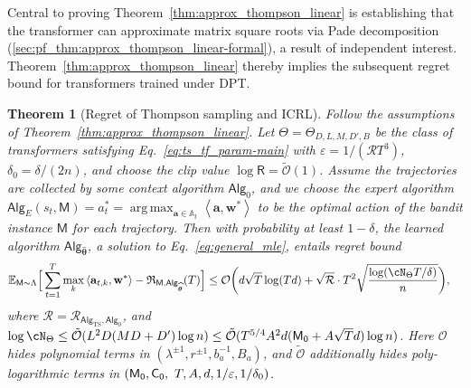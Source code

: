 \documentclass[10pt]{article}
\newtheorem{theorem}{Theorem}
\newcommand{\eps}{\varepsilon}
\DeclareMathOperator*{\argmax}{arg\,max}
\renewcommand{\cO}{\mathcal{O}}
\newcommand{\<}{\left\langle}
\renewcommand{\>}{\right\rangle}
\newcommand{\E}{\mathbb{E}}
\newcommand{\inst}{{\mathsf{M}}}
\newcommand{\TS}{{\mathrm{TS}}}
\newcommand{\Tpspar}{{\lambda}}
\newcommand{\Tpsparn}{{r}}
\newcommand{\tcO}{{\tilde{\mathcal O}}}
\newcommand{\state}{{s}}
\newcommand{\action}{{a}}
\newcommand{\totlen}{{T}}
\newcommand{\sAlg}{{\mathsf{Alg}}}
\newcommand{\Numobs}{{n}}
\newcommand{\Parspace}{{\Theta}}
\newcommand{\esttfpar}{{\widehat{\btheta}}}
\newcommand{\prior}{{\Lambda}}
\newcommand{\shortexp}{{E}}
\newcommand{\layer}{{L}}
\newcommand{\hidden}{{D'}}
\newcommand{\head}{{M}}
\newcommand{\clipval}{{\mathsf{R}}}
\newcommand{\embd}{{D}}
\newcommand{\totreward}{{\mathfrak{R}}}
\newcommand{\distratio}{{\mathcal{R}}}
\newcommand{\Numact}{{A}}
\newcommand{\neuron}{{\mathsf{M_0}}}
\newcommand{\weightn}{{{\mathsf{C_0}}}}
\def\sA{{\mathbb{A}}}
\def\btheta{{\boldsymbol \theta}}
\def\ba{{\mathbf a}}
\def\bw{{\mathbf w}}
\begin{document}
Central to proving Theorem~\ref{thm:approx_thompson_linear} is establishing that the transformer can approximate matrix square roots via Pade decomposition (\cref{sec:pf_thm:approx_thompson_linear-formal}), a result of independent interest. Theorem~\ref{thm:approx_thompson_linear} thereby implies the subsequent regret bound for transformers trained under DPT.
\begin{theorem}
[Regret of Thompson sampling and ICRL]\label{thm:ts_linear_regret}
Follow the assumptions of Theorem~\ref{thm:approx_thompson_linear}. Let $\Theta = \Theta_{D, L, M, \hidden, B}$ be the class of transformers satisfying Eq.~\eqref{eq:ts_tf_param-main} with $\eps=1/(\distratio\totlen^3)$,   $\delta_0=\delta/(2n)$, and choose the clip value $\log \clipval = \tcO(1)$. Assume the trajectories are collected by some context algorithm $\sAlg_0$, and we choose the expert algorithm $\sAlg_\shortexp(\state_t,\inst)=\action^*_t=\argmax_{\ba\in\sA_t}\<\ba,\bw^*\>$ to be the optimal action of the bandit instance $\inst$ for each trajectory. Then with probability at least $1-\delta$, the learned algorithm $\sAlg_{\esttfpar}$, a solution to Eq.~\eqref{eq:general_mle}, entails regret bound
\begin{align*}
\E_{\inst\sim\prior}\Big[\sum_{t=1}^\totlen\max_{k}\<\ba_{t,k},\bw^*\>-\totreward_{\inst,\sAlg_\esttfpar}(\totlen)\Big]&\leq \cO \bigg( d\sqrt{T}\log(Td)+ \sqrt{\distratio} \cdot\totlen^2\sqrt{\frac{\log ( \cN_{\Parspace} \totlen/\delta ) }{n} } \bigg),
\end{align*}
where $\distratio = \distratio_{\sAlg_\TS,\sAlg_0}$, and $\log \cN_{\Parspace} \le \tcO(\layer^2\embd(\head\embd+\hidden)\log \Numobs )  \leq\tcO(\totlen^{5/4}\Numact^2 d(\neuron+\Numact\sqrt{\totlen}d)\log\Numobs)$. Here $\cO$ hides polynomial terms in $(\Tpspar^{\pm1}, \Tpsparn^{\pm1}, b_a^{-1}, B_a)$, and $\tcO$ additionally hides poly-logarithmic terms in   $(\neuron,\weightn,\\~ \totlen, \Numact, d, 1/\eps, 1/\delta_0)$.
\end{theorem}
\end{document}
